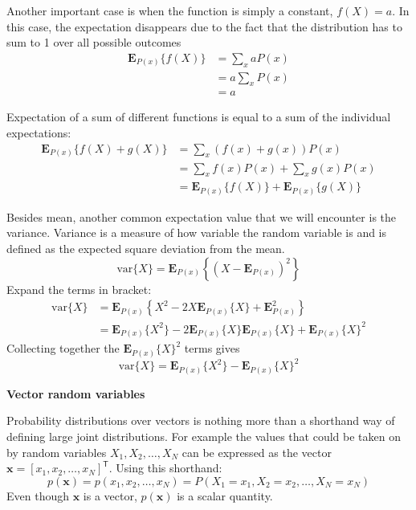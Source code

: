 \documentclass[a4paper,11pt]{article} %
\begin{document}
Another important case is when the function is simply a constant, $f(X)=a$.
In this case, the expectation
disappears due to the fact that the distribution has to sum to 1 over all possible outcomes
\begin{align*}
\mathbf{E}_{P(x)}\{f(X)\} & = \sum_{x} aP(x) \\
& = a \sum_{x} P(x) \\
& = a
\end{align*}

Expectation of a sum of different functions is equal to a sum of the individual expectations:
\begin{align*}
\mathbf{E}_{P(x)}\{ f(X) + g(X) \} & = \sum_{x} (f(x) + g(x)) P(x) \\
& = \sum_{x} f(x) P(x) + \sum_{x} g(x) P(x) \\
& = \mathbf{E}_{P(x)}\{ f(X) \} + \mathbf{E}_{P(x)}\{ g(X) \}
\end{align*}

Besides mean, another common expectation value that we will encounter is the variance.
Variance is a measure of how variable the random variable is and is defined as the expected
square deviation from the mean.
\begin{equation}
\mathrm{var}\{X\} = \mathbf{E}_{P(x)}\left\{ \left(X - \mathbf{E}_{P(x)}\right)^2 \right\}
\end{equation}
Expand the terms in bracket:
\begin{align*}
\mathrm{var}\{X\} & = \mathbf{E}_{P(x)}\left\{
X^2 - 2X\mathbf{E}_{P(x)}\{X\} + \mathbf{E}_{P(x)}^2
\right\} \\
& = \mathbf{E}_{P(x)}\{X^2\} - 2\mathbf{E}_{P(x)}\{X\}\mathbf{E}_{P(x)}\{X\} +
\mathbf{E}_{P(x)}\{X\}^2
\end{align*}
Collecting together the $\mathbf{E}_{P(x)}\{X\}^2$ terms gives
\begin{equation}
\mathrm{var}\{X\} = \mathbf{E}_{P(x)}\{X^2\} - \mathbf{E}_{P(x)}\{X\}^2
\end{equation}

\textbf{Vector random variables}

Probability distributions over vectors is nothing more than a shorthand way of defining
large joint distributions. For example the values that could be taken on by random variables
$X_{1}, X_{2}, \ldots, X_{N}$ can be expressed as the vector
$\mathbf{x} = [x_{1}, x_{2}, \ldots, x_{N}]^{\mathsf{T}}$. Using this shorthand:
\begin{equation}
p(\mathbf{x}) = p(x_1,x_2,\ldots,x_N) = P(X_1=x_1, X_2=x_2, \ldots, X_N=x_N)
\end{equation}
Even though $\mathbf{x}$ is a vector, $p(\mathbf{x})$ is a scalar quantity.
\end{document}
